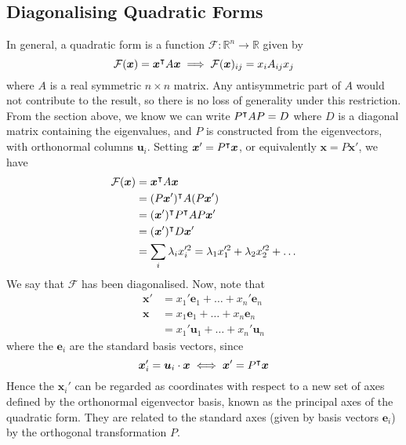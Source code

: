 \documentclass{article}
\begin{document}
\subsection{Diagonalising Quadratic Forms}
In general, a quadratic form is a function $\mathcal F\colon \mathbb R^n \to \mathbb R$ given by
\[ \mathcal F(\bm x) = \bm x^\intercal A \bm x \implies \mathcal F(\bm x)_{ij} = x_i A_{ij} x_j \]
where $A$ is a real symmetric $n \times n$ matrix. Any antisymmetric part of $A$ would not contribute to the result, so there is no loss of generality under this restriction. From the section above, we know we can write $P^\intercal A P = D$ where $D$ is a diagonal matrix containing the eigenvalues, and $P$ is constructed from the eigenvectors, with orthonormal columns $\bm u_i$. Setting $\bm x' = P^\intercal \bm x$, or equivalently $\bm x = P \bm x'$, we have
\begin{align*}
	\mathcal F(\bm x) & = \bm x^\intercal A \bm x                                              \\
	                  & = (P \bm x')^\intercal A (P \bm x')                                    \\
	                  & = (\bm x')^\intercal P^\intercal A P \bm x'                           \\
	                  & = (\bm x')^\intercal D \bm x'                                          \\
	                  & = \sum_i \lambda_i x_i'^2 = \lambda_1 x_1'^2 + \lambda_2 x_2'^2 + \dots
\end{align*}
We say that $\mathcal F$ has been diagonalised. Now, note that
\begin{align*}
	\bm x' & = x_1'\bm e_1 + \dots + x_n'\bm e_n \\
	\bm x  & = x_1\bm e_1 + \dots + x_n\bm e_n   \\
	       & = x_1'\bm u_1 + \dots + x_n'\bm u_n
\end{align*}
where the $\bm e_i$ are the standard basis vectors, since
\[ \bm x_i' = \bm u_i \cdot \bm x \iff \bm x' = P^\intercal \bm x \]
Hence the $\bm x_i'$ can be regarded as coordinates with respect to a new set of axes defined by the orthonormal eigenvector basis, known as the principal axes of the quadratic form. They are related to the standard axes (given by basis vectors $\bm e_i$) by the orthogonal transformation $P$.
\end{document}
